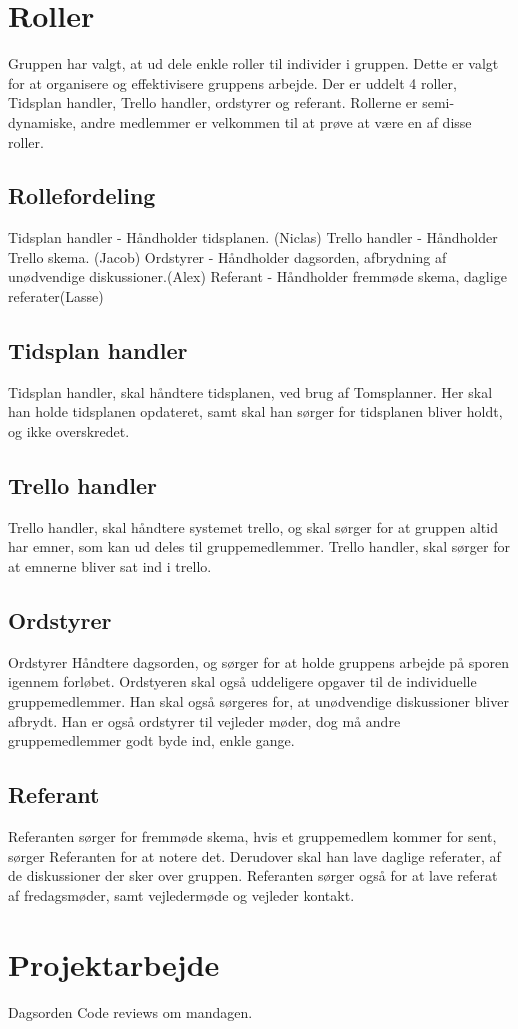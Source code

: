 \section{Roller}
Gruppen har valgt, at ud dele enkle roller til individer i gruppen. Dette er valgt for at organisere og effektivisere gruppens arbejde. Der er uddelt 4 roller, Tidsplan handler, Trello handler, ordstyrer og referant. Rollerne er semi-dynamiske, andre medlemmer er velkommen til at prøve at være en af disse roller.

\subsection{Rollefordeling}
Tidsplan handler - Håndholder tidsplanen. (Niclas)
Trello handler - Håndholder Trello skema. (Jacob)
Ordstyrer - Håndholder dagsorden, afbrydning af unødvendige diskussioner.(Alex)
Referant - Håndholder fremmøde skema, daglige referater(Lasse)

\subsection{Tidsplan handler}
Tidsplan handler, skal håndtere tidsplanen, ved brug af Tomsplanner. Her skal han holde tidsplanen opdateret, samt skal han sørger for tidsplanen bliver holdt, og ikke overskredet.

\subsection{Trello handler}
Trello handler, skal håndtere systemet trello, og skal sørger for at gruppen altid har emner, som kan ud deles til gruppemedlemmer. Trello handler, skal sørger for at emnerne bliver sat ind i trello.

\subsection{Ordstyrer}
Ordstyrer Håndtere dagsorden, og sørger for at holde gruppens arbejde på sporen igennem forløbet. Ordstyeren skal også uddeligere opgaver til de individuelle gruppemedlemmer. Han skal også sørgeres for, at unødvendige diskussioner bliver afbrydt. Han er også ordstyrer til vejleder møder, dog må andre gruppemedlemmer godt byde ind, enkle gange.

\subsection{Referant}
Referanten sørger for fremmøde skema, hvis et gruppemedlem kommer for sent, sørger Referanten for at notere det. Derudover skal han lave daglige referater, af de diskussioner der sker over gruppen. Referanten sørger også for at lave referat af fredagsmøder, samt vejledermøde og vejleder kontakt. 

\section{Projektarbejde}
Dagsorden
Code reviews om mandagen.